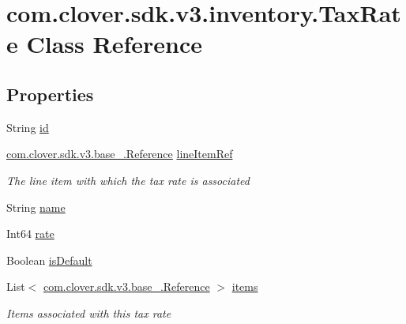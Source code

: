 \hypertarget{classcom_1_1clover_1_1sdk_1_1v3_1_1inventory_1_1_tax_rate}{}\section{com.\+clover.\+sdk.\+v3.\+inventory.\+Tax\+Rate Class Reference}
\label{classcom_1_1clover_1_1sdk_1_1v3_1_1inventory_1_1_tax_rate}
\subsection*{Properties}
\begin{DoxyCompactItemize}
\item 
String \hyperlink{classcom_1_1clover_1_1sdk_1_1v3_1_1inventory_1_1_tax_rate_aa8d6d92b2aecd16878a6a7f0c2911727}{id}
\item 
\hyperlink{classcom_1_1clover_1_1sdk_1_1v3_1_1base___1_1_reference}{com.\+clover.\+sdk.\+v3.\+base\+\_\+.\+Reference} \hyperlink{classcom_1_1clover_1_1sdk_1_1v3_1_1inventory_1_1_tax_rate_ab451f4b66ebb3b62ac8dce6204f47a85}{line\+Item\+Ref}
\begin{DoxyCompactList}\small\item\em The line item with which the tax rate is associated \end{DoxyCompactList}\item 
String \hyperlink{classcom_1_1clover_1_1sdk_1_1v3_1_1inventory_1_1_tax_rate_aaef42056f284f60e0f2cee372d87bf05}{name}
\item 
Int64 \hyperlink{classcom_1_1clover_1_1sdk_1_1v3_1_1inventory_1_1_tax_rate_abaadea59cd5358b88cdcfcee50ce6a22}{rate}
\item 
Boolean \hyperlink{classcom_1_1clover_1_1sdk_1_1v3_1_1inventory_1_1_tax_rate_a7e7861d25f19b6b9567639a12566a306}{is\+Default}
\item 
List$<$ \hyperlink{classcom_1_1clover_1_1sdk_1_1v3_1_1base___1_1_reference}{com.\+clover.\+sdk.\+v3.\+base\+\_\+.\+Reference} $>$ \hyperlink{classcom_1_1clover_1_1sdk_1_1v3_1_1inventory_1_1_tax_rate_a6969091212021899b02f5f43bd5f62d6}{items}
\begin{DoxyCompactList}\small\item\em Items associated with this tax rate \end{DoxyCompactList}\end{DoxyCompactItemize}


